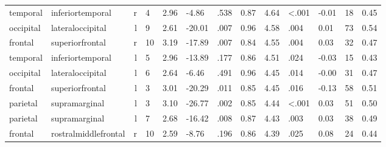\documentclass{article}
\begin{document}
\begin{longtable}{llrR{1.3cm}R{1cm}R{1.3cm}R{1cm}R{1cm}R{1.3cm}R{1cm}R{1.8cm}R{1.3cm}R{1.8cm}}
  temporal &          inferiortemporal &    r &         4 &                  2.96 &            -4.86 &               .538 &                               0.87 &                          4.64 &                   \textless.001 &  -0.01 &     18 &      0.45 \\
 occipital &          lateraloccipital &    l &         9 &                  2.61 &           -20.01 &               .007 &                               0.96 &                          4.58 &                            .004 &   0.01 &     73 &      0.54 \\
   frontal &           superiorfrontal &    r &        10 &                  3.19 &           -17.89 &               .007 &                               0.84 &                          4.55 &                            .004 &   0.03 &     32 &      0.47 \\
  temporal &          inferiortemporal &    l &         5 &                  2.96 &           -13.89 &               .177 &                               0.86 &                          4.51 &                            .024 &  -0.03 &     15 &      0.43 \\
 occipital &          lateraloccipital &    l &         6 &                  2.64 &            -6.46 &               .491 &                               0.96 &                          4.45 &                            .014 &  -0.00 &     31 &      0.47 \\
   frontal &           superiorfrontal &    l &         3 &                  3.01 &           -20.29 &               .011 &                               0.85 &                          4.45 &                            .016 &  -0.13 &     58 &      0.51 \\
  parietal &             supramarginal &    l &         3 &                  3.10 &           -26.77 &               .002 &                               0.85 &                          4.44 &                   \textless.001 &   0.03 &     51 &      0.50 \\
  parietal &             supramarginal &    l &         7 &                  2.68 &           -16.42 &               .008 &                               0.87 &                          4.43 &                            .003 &   0.03 &     38 &      0.49 \\
   frontal &      rostralmiddlefrontal &    r &        10 &                  2.59 &            -8.76 &               .196 &                               0.86 &                          4.39 &                            .025 &   0.08 &     24 &      0.44 \\

\end{longtable}
\end{document}
